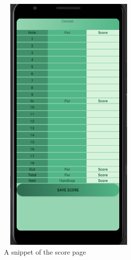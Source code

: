 \begin{figure}[H]
    \centering
    \includegraphics[width=7cm, height = 13cm]{img/scorePage.PNG}
    \caption{A snippet of the score page}
    \label{fig:altas config}
\end{figure}

